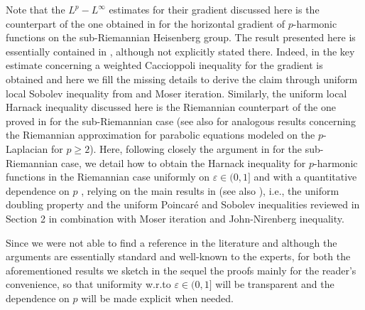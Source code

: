 \documentclass[10pt]{amsart}
\numberwithin{equation}{section}
\theoremstyle{definition}
\begin{document}
Note that the $L^p-L^\infty$ estimates for their gradient discussed here is the counterpart of the one obtained in \cite{Zhong} for the horizontal gradient of $p$-harmonic functions on the sub-Riemannian Heisenberg group. The result presented here is essentially contained in \cite{CapoCitti4}, although not explicitly stated there. Indeed, in \cite{CapoCitti4} the key estimate concerning a weighted Caccioppoli inequality for the gradient is obtained and here we fill the missing details to derive the claim through uniform local Sobolev inequality from \cite{DoMaRi} and Moser iteration.
Similarly, the uniform local Harnack inequality discussed here is the Riemannian counterpart of the one proved in \cite{CapDanGar} for the sub-Riemannian case (see also \cite{CapoCitti3} for analogous results concerning the Riemannian approximation for parabolic equations modeled on the $p$-Laplacian for $p\geq 2$). Here, following closely the argument in \cite{CapDanGar} for the sub-Riemannian case, we detail how to obtain the Harnack inequality for $p$-harmonic functions in the Riemannian case uniformly on $\varepsilon \in (0,1]$ and with a quantitative dependence on $p$ , relying on the main results in \cite{DoMaRi} (see also \cite{CapoCitti3}), i.e., the uniform doubling property and the uniform Poincar\'e and Sobolev inequalities reviewed in Section 2 in combination with Moser iteration and John-Nirenberg inequality. 


Since we were not able to find a reference in the literature and although the arguments are essentially standard and well-known to the experts, for both the aforementioned results we sketch in the sequel the proofs mainly for the reader's convenience, so that uniformity w.r.to $\varepsilon \in (0,1]$ will be transparent and the dependence on $p$ will be made explicit when needed.
\end{document}
